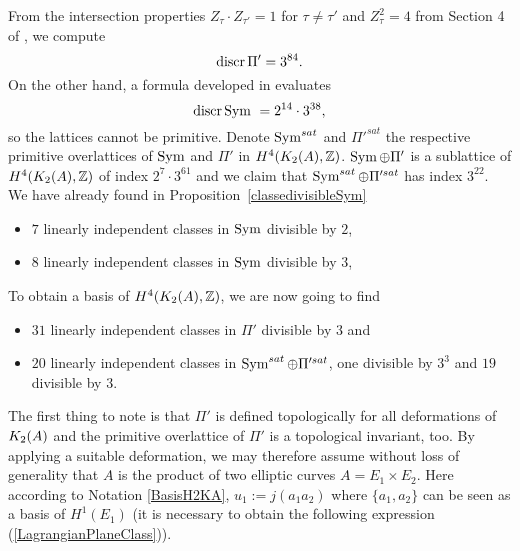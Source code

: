 From the intersection properties $Z_\tau \cdot Z_{\tau'} = 1$ for $\tau\neq \tau'$ and $Z_\tau^2 = 4$ from Section 4 of \cite{Hassett}, we compute
\begin{equation}
 \operatorname{discr} \Pi' = 3^{84}.
 \label{discrPi}
\end{equation}
On the other hand, a formula developed in \cite{Kapfer} evaluates
\begin{equation} \label{DiscrSym}
\operatorname{discr} \operatorname{Sym} \ = 2^{14}\cdot 3^{38},
\end{equation}
so the lattices cannot be primitive. Denote $\operatorname{Sym}^{sat}$ and $\Pi'^{sat}$ the respective primitive overlattices of $\operatorname{Sym}$ and $\Pi'$ in $H^4(K_{ 2 }( A ),\mathbb{Z})$. $\operatorname{Sym} \oplus\Pi'$ is a sublattice of $H^4(K_{ 2 }( A ),\mathbb{Z})$ of index $2^{7}\cdot 3^{61}$ and we claim that $\operatorname{Sym}^{sat}\oplus \Pi'^{sat}$ has index $3^{22}$. 
We have already found in Proposition~\ref{classedivisibleSym}
\begin{itemize}
 \item $7$ linearly independent classes in $\operatorname{Sym}$ divisible by $2$,
 \item $8$ linearly independent classes in $\operatorname{Sym}$ divisible by $3$,
\end{itemize}
To obtain a basis of $H^4(K_{ 2 }( A ),\mathbb{Z})$, 
we are now going to find
\begin{itemize}
 \item $31$ linearly independent classes in $\Pi'$ divisible by $3$ and
 \item $20$ linearly independent classes in $\operatorname{Sym}^{sat}\oplus \Pi'^{sat}$, one divisible by $3^3$ and $19$ divisible by $3$.
\end{itemize}


The first thing to note is that $\Pi'$ is defined topologically for all deformations of $K_{ 2 }( A )$ and the primitive overlattice of $\Pi'$ is a topological invariant, too.  
By applying a suitable deformation, we may therefore assume without loss of generality that $A$ is the product of two elliptic curves $A=E_1\times E_2$. Here according to Notation \ref{BasisH2KA}, $u_1:=j(a_1 a_2)$ where $\{a_1,a_2\}$ can be seen as a basis of $H^1(E_1)$ (it is necessary to obtain the following expression (\ref{LagrangianPlaneClass})).

